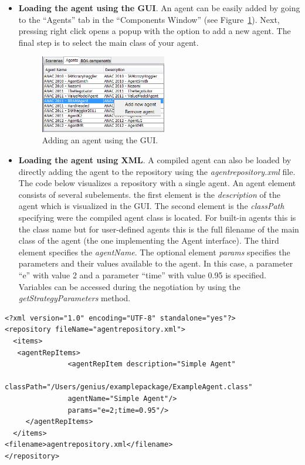 \documentclass[]{article}
\begin{document}
\begin{itemize}	
\item \textbf{Loading the agent using the GUI}. An agent can be easily added by going to the ``Agents'' tab in the ``Components Window'' (see Figure~\ref{fig:addAgent}). Next, pressing right click opens a popup with the option to add a new agent. The final step is to select the main class of your agent.

\begin{figure}[h] 
	\center
	\includegraphics[width=5.5cm]{media/AddAgent.png}
	\caption{Adding an agent using the GUI.}
	\label{fig:addAgent}
\end{figure}

\item \textbf{Loading the agent using XML}. A compiled agent can also be loaded by directly adding the agent to the repository using the \textit{agentrepository.xml} file. The code below visualizes a repository with a single agent. An agent element consists of several subelements. the first element is the \textit{description} of the agent which is visualized in the GUI. The second element is the \textit{classPath} specifying were the compiled agent class is located. For built-in agents this is the class name but for user-defined agents this is the full filename of the main class of the agent (the one implementing the Agent interface). The third element specifies the \textit{agentName}. The optional element \textit{params} specifies the parameters and their values available to the agent. In this case, a parameter ``e'' with value 2 and a parameter ``time'' with value 0.95 is specified. Variables can be accessed during the negotiation by using the \textit{getStrategyParameters} method.
\end{itemize}

\begin{lstlisting}
<?xml version="1.0" encoding="UTF-8" standalone="yes"?>
<repository fileName="agentrepository.xml">
  <items>
   <agentRepItems>
               <agentRepItem description="Simple Agent" 
               classPath="/Users/genius/examplepackage/ExampleAgent.class"
               agentName="Simple Agent"/>
               params="e=2;time=0.95"/>
     </agentRepItems>
  </items>
<filename>agentrepository.xml</filename>
</repository>
\end{lstlisting}
\end{document}
